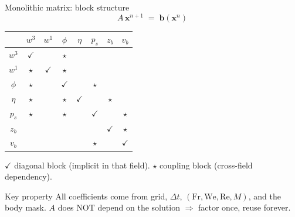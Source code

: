 \documentclass[aspectratio=169, 10pt]{beamer}
\newcommand{\Fr}{\mathrm{Fr}}
\newcommand{\We}{\mathrm{We}}
\newcommand{\Rey}{\mathrm{Re}}
\newcommand{\xx}{\mathbf{x}}
\newcommand{\bb}{\mathbf{b}}
\begin{document}
\begin{frame}{Monolithic matrix: block structure}
\[
A\,\xx^{n+1} \;=\; \bb(\xx^n)
\]

\centering
\small
\renewcommand{\arraystretch}{1.4}
\begin{tabular}{c|ccccccc}
 & $w^3$ & $w^1$ & $\phi$ & $\eta$ & $p_s$ & $z_b$ & $v_b$ \\ \hline
$w^3$ & \cellcolor{primarycol!35}$\checkmark$ & & \cellcolor{accentcol!35}$\star$ & & & & \\
$w^1$ & \cellcolor{accentcol!35}$\star$ & \cellcolor{primarycol!35}$\checkmark$ & \cellcolor{accentcol!35}$\star$ & & & & \\
$\phi$ & \cellcolor{accentcol!35}$\star$ & & \cellcolor{primarycol!35}$\checkmark$ & & \cellcolor{accentcol!35}$\star$ & & \\
$\eta$ & \cellcolor{accentcol!35}$\star$ & & \cellcolor{accentcol!35}$\star$ & \cellcolor{primarycol!35}$\checkmark$ & & \cellcolor{accentcol!35}$\star$ & \\
$p_s$ & \cellcolor{accentcol!35}$\star$ & & \cellcolor{accentcol!35}$\star$ & & \cellcolor{primarycol!35}$\checkmark$ & & \cellcolor{accentcol!35}$\star$ \\
$z_b$ & & & & & & \cellcolor{primarycol!35}$\checkmark$ & \cellcolor{accentcol!35}$\star$ \\
$v_b$ & & & & & \cellcolor{accentcol!35}$\star$ & & \cellcolor{primarycol!35}$\checkmark$ \\
\end{tabular}

\vspace{0.5em}
\small
\colorbox{primarycol!35}{$\checkmark$} diagonal block (implicit in that field). \quad
\colorbox{accentcol!35}{$\star$} coupling block (cross-field dependency).

\vspace{0.6em}
\begin{alertblock}{Key property}
All coefficients come from grid, $\Delta t$, $(\Fr, \We, \Rey, M)$, and the body mask. \alert{$A$ does NOT depend on the solution} $\Rightarrow$ factor once, reuse forever.
\end{alertblock}
\end{frame}
\end{document}
